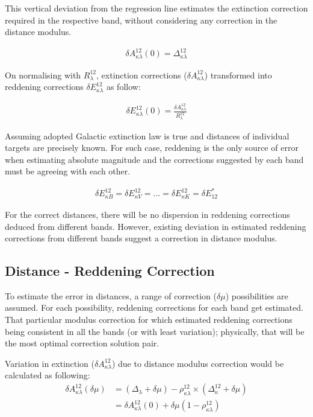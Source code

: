 \documentclass[12pt,a4paper]{article}
\begin{document}
This vertical deviation from the regression line estimates the extinction correction required in the respective band, without considering any correction in the distance modulus.

\begin{align*}
       \delta A_{\kappa \lambda}^{12} (0) = \Delta_{\kappa \lambda}^{12} 
\end{align*}



On normalising with $R_\lambda^{12}$, extinction corrections ($\delta A^{12}_{\kappa \lambda }$) transformed into reddening corrections $\delta E_{\kappa \lambda}^{12}$ as follow: 

\begin{align*}
\delta E^{12}_{\kappa \lambda} (0) = \frac{\delta A^{12}_{\kappa \lambda }}{R_\lambda^{12}}
\end{align*}

Assuming adopted Galactic extinction law is true and distances of individual targets are precisely known. For such case, reddening is the only source of error when estimating absolute magnitude and the corrections suggested by each band must be agreeing with each other. 

\begin{align*}
    \delta E^{12}_{\kappa B } = \delta E^{12}_{\kappa V} = ... = \delta E^{12}_{\kappa K} = \delta E^*_{12}
\end{align*}

For the correct distances, there will be no dispersion in reddening corrections deduced from different bands. However, existing deviation in estimated reddening corrections from different bands suggest a correction in distance modulus. 

\subsection{Distance - Reddening Correction}

To estimate the error in distances, a range of correction ($\delta \mu$) possibilities are assumed. For each possibility, reddening corrections for each band get estimated. That particular modulus correction for which estimated reddening corrections being consistent in all the bands (or with least variation); physically, that will be the most optimal correction solution pair.

Variation in extinction ($\delta A^{12}_{\kappa \lambda}$) due to distance modulus correction would be calculated as following:
 {\begin{align*}
     \delta A_{\kappa \lambda}^{12} (\delta \mu) & = (\Delta_\lambda + \delta \mu) - \rho_{\kappa \lambda}^{12} \times (\Delta_\kappa^{12} + \delta \mu) \\
     & = \delta A_{\kappa \lambda}^{12}(0) + \delta \mu( 1 - \rho_{\kappa \lambda}^{12} )
 \end{align*}}
\end{document}
